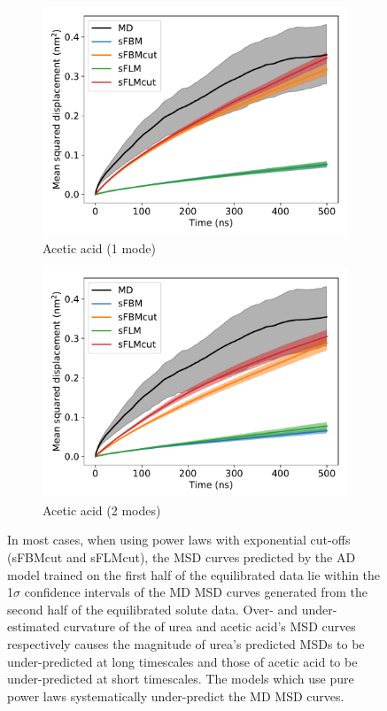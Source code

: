 \documentclass{article}
\begin{document}
\begin{figure}
\begin{subfigure}{0.45\textwidth}
  \includegraphics[width=\textwidth]{1mode_msd_comparison_ACH_train_front.pdf}
  \caption{Acetic acid (1 mode)}\label{fig:1mode_msd_comparison_ACH_train_front}
  \end{subfigure}
  \begin{subfigure}{0.45\textwidth}
  \includegraphics[width=\textwidth]{2mode_msd_comparison_ACH_train_front.pdf}
  \caption{Acetic acid (2 modes)}\label{fig:2mode_msd_comparison_ACH_train_front}
  \end{subfigure} 
  \caption{In most cases, when using power laws with exponential cut-offs 
  (sFBMcut and sFLMcut), the MSD curves predicted by the AD model trained on 
  the first half of the equilibrated data lie within the 1$\sigma$ confidence
  intervals of the MD MSD curves generated from the second half of the equilibrated
  solute data. Over- and under-estimated curvature of the of urea and acetic acid's 
  MSD curves respectively causes the magnitude of urea's predicted MSDs to be 
  under-predicted at long timescales and those of acetic acid to be under-predicted
  at short timescales. The models which use pure power laws systematically under-predict
  the MD MSD curves. 
  }\label{fig:train_test}
  \end{figure}
  
\end{document}
